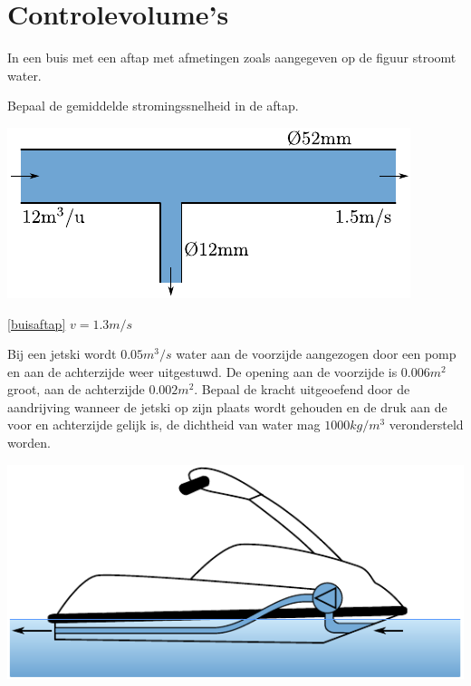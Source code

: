 \chapter{Controlevolume's}
\label{sec:Controlevolume's}
\begin{toepassing}
	\label{buisaftap}
In een buis met een aftap met afmetingen zoals aangegeven op de figuur stroomt water.
		
Bepaal de gemiddelde stromingssnelheid in de aftap.

	\centering
	\includegraphics{fig/behoudsvergelijkingen/buisaftap}
\end{toepassing}
\begin{antwoord}{\ref{buisaftap}}
	$v = 1.3 \unit{m/s}$
\end{antwoord}
\begin{toepassing}
	\label{jetski}
Bij een jetski wordt $0.05 \unit{m^3/s}$ water aan de voorzijde aangezogen door een pomp en aan de achterzijde weer uitgestuwd. De opening aan de voorzijde is $0.006 \unit{m^2}$ groot, aan de achterzijde $0.002 \unit{m^2}$. Bepaal de kracht uitgeoefend door de aandrijving wanneer de jetski op zijn plaats wordt gehouden en de druk aan de voor en achterzijde gelijk is, de dichtheid van water mag $1000 \unit{kg/m^3}$ verondersteld worden.

	\centering
	\includegraphics{fig/behoudsvergelijkingen/jetski}
\end{toepassing}

